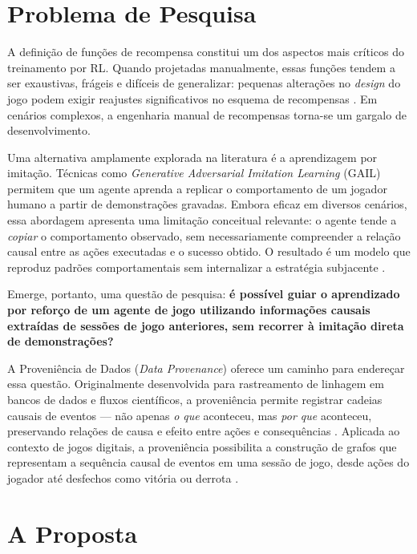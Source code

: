 \section{Problema de Pesquisa}
\label{sec:problema}

A definição de funções de recompensa constitui um dos aspectos mais críticos
do treinamento por RL. Quando projetadas manualmente, essas funções tendem a
ser exaustivas, frágeis e difíceis de generalizar: pequenas alterações no
\textit{design} do jogo podem exigir reajustes significativos no esquema de
recompensas \cite{ng1999reward}. Em cenários complexos, a engenharia manual
de recompensas torna-se um gargalo de desenvolvimento.

Uma alternativa amplamente explorada na literatura é a aprendizagem por
imitação. Técnicas como \textit{Generative Adversarial Imitation Learning}
(GAIL) permitem que um agente aprenda a replicar o comportamento de um
jogador humano a partir de demonstrações gravadas. Embora eficaz em diversos
cenários, essa abordagem apresenta uma limitação conceitual relevante: o
agente tende a \textit{copiar} o comportamento observado, sem necessariamente
compreender a relação causal entre as ações executadas e o sucesso obtido. O
resultado é um modelo que reproduz padrões comportamentais sem internalizar a
estratégia subjacente \cite{ho2016gail}.

Emerge, portanto, uma questão de pesquisa: \textbf{é possível guiar o
aprendizado por reforço de um agente de jogo utilizando informações causais
extraídas de sessões de jogo anteriores, sem recorrer à imitação direta de
demonstrações?}

A Proveniência de Dados (\textit{Data Provenance}) oferece um caminho para
endereçar essa questão. Originalmente desenvolvida para rastreamento de
linhagem em bancos de dados e fluxos científicos, a proveniência permite
registrar cadeias causais de eventos --- não apenas \textit{o que} aconteceu,
mas \textit{por que} aconteceu, preservando relações de causa e efeito entre
ações e consequências \cite{provenance_base}. Aplicada ao contexto de jogos
digitais, a proveniência possibilita a construção de grafos que representam a
sequência causal de eventos em uma sessão de jogo, desde ações do jogador até
desfechos como vitória ou derrota \cite{kohwalter2020provenance}.

\section{A Proposta}
\label{sec:proposta}

